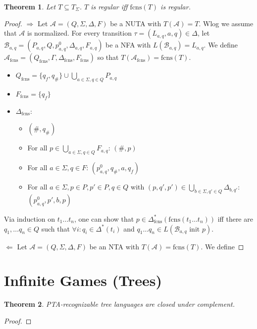 \documentclass{article}
\newtheorem{theorem}{Theorem}
\begin{document}
\vspace{1cm}
\begin{theorem}
\label{fcns_correct}
	Let $T \subseteq T_\Sigma$. $T$ is regular iff $\text{fcns}(T)$ is regular.
\end{theorem}
\begin{proof}
	$\boldsymbol{\Rightarrow}$ Let $\mathcal{A} = (Q, \Sigma, \Delta, F)$ be a NUTA with $T(\mathcal{A}) = T$. Wlog we assume that $\mathcal{A}$ is normalized. For every transition $\tau = (L_{a,q}, a, q) \in \Delta$, let $\mathcal{B}_{a,q} = (P_{a,q}, Q, p^0_{a,q}, \Delta_{a,q}, F_{a,q})$ be a NFA with $L(\mathcal{B}_{a,q}) = L_{a,q}$. We define $\mathcal{A}_\text{fcns} = (Q_\text{fcns}, \Gamma, \Delta_\text{fcns}, F_\text{fcns})$ so that $T(\mathcal{A}_\text{fcns}) = \text{fcns}(T)$.
	
	\begin{itemize}
		\item $Q_\text{fcns} = \{q_f, q_\#\} \cup \bigcup\limits_{a \in \Sigma, q \in Q} P_{a, q}$
		\item $F_\text{fcns} = \{q_f\}$
		\item $\Delta_\text{fcns}$:
		\begin{itemize}
			\item $(\#, q_\#)$
			\item For all $p \in \bigcup\limits_{a \in \Sigma, q \in Q} F_{a, q}$: $(\#, p)$
			\item For all $a \in \Sigma, q \in F$: $(p^0_{a,q}, q_\#, a, q_f)$
			\item For all $a \in \Sigma, p \in P, p' \in P, q \in Q$ with $(p, q', p') \in \bigcup\limits_{b \in \Sigma, q' \in Q} \Delta_{b, q'}$: $(p^0_{a,q}, p', b, p)$
		\end{itemize}
	\end{itemize}
	
	Via induction on $t_1 \dots t_n$, one can show that $p \in \Delta^*_\text{fcns}(\text{fcns}(t_1 \dots t_n))$ iff there are $q_1, \dots q_n \in Q$ such that $\forall i: q_i \in \Delta^*(t_i)$ and $q_1 \dots q_n \in L(\mathcal{B}_{a,q} \text{ init } p)$.
	
	$\boldsymbol{\Leftarrow}$ Let $\mathcal{A} = (Q, \Sigma, \Delta, F)$ be an NTA with $T(\mathcal{A}) = \text{fcns}(T)$. We define %
\end{proof}




\newpage
\section{Infinite Games (Trees)}
\begin{theorem}
\label{pta_complement}
	PTA-recognizable tree languages are closed under complement.
\end{theorem}
\begin{proof}
\end{proof}
\end{document}
